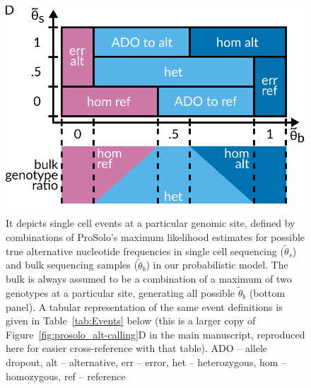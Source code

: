 \documentclass[authoryear,preprint,11pt]{scrartcl}
\begin{document}
\begin{figure}[tbp]
 \includegraphics[width=.7\linewidth]{figs/Event_space.pdf}\\
 \caption{
  It depicts single cell events at a particular genomic site, defined by combinations of ProSolo's maximum likelihood estimates for possible true alternative nucleotide frequencies in single cell sequencing ($\tilde{\theta}_s$) and bulk sequencing samples ($\tilde{\theta}_b$) in our probabilistic model.
  The bulk is always assumed to be a combination of a maximum of two genotypes at a particular site, generating all possible $\tilde{\theta}_b$ (bottom panel).
  A tabular representation of the same event definitions is given in Table~\ref{tab:Events} below (this is a larger copy of Figure~\ref{fig:prosolo_alt-calling}D in the main manuscript, reproduced  here for easier cross-reference with that table).\footnotesize\newline
  ADO -- allele dropout, alt -- alternative, err -- error, het -- heterozygous, hom -- homozygous, ref -- reference
  }
 \label{fig:event-space}
\end{figure}
\end{document}
